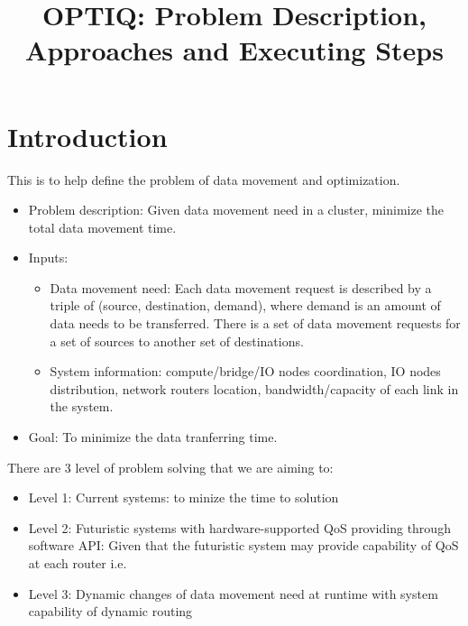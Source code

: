 \documentclass[letter]{article}
\title{OPTIQ: Problem Description, Approaches and Executing Steps}
\begin{document}
\maketitle



\section{Introduction}
This is to help define the problem of data movement and optimization.

\begin{itemize}
\item Problem description: Given data movement need in a cluster, minimize the total data movement time.
\item Inputs: 
\begin{itemize}
\item Data movement need: Each data movement request is described by a triple of (source, destination, demand), where demand is an amount of data needs to be transferred. There is a set of data movement requests for a set of sources to another set of destinations.
\item System information: compute/bridge/IO nodes coordination, IO nodes distribution, network routers location, bandwidth/capacity of each link in the system. 
\end{itemize}
\item Goal: To minimize the data tranferring time.
\end{itemize}

There are 3 level of problem solving that we are aiming to:
\begin{itemize}
\item Level 1: Current systems: to minize the time to solution
\item Level 2: Futuristic systems with hardware-supported QoS providing through software API: Given that the futuristic system may provide capability of QoS at each router i.e.
\item Level 3: Dynamic changes of data movement need at runtime with system capability of dynamic routing
\end{itemize}
\end{document}
